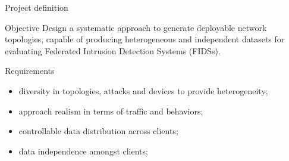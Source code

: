 \begin{frame}{Project definition}
  \begin{block}{Objective}
  Design a systematic approach to generate \alert<+>{deployable} network topologies, capable of producing \alert<+>{heterogeneous} and \alert<+>{independent} datasets for evaluating Federated Intrusion Detection Systems (FIDSs).
  \end{block}

  \pause
  \begin{block}{Requirements}
    \begin{itemize}[<+->]
      \item \alert{diversity} in topologies, attacks and devices to provide heterogeneity;
      \item approach \alert{realism} in terms of traffic and behaviors;
      \item \alert{controllable} data distribution across clients;
      \item data \alert{independence} amongst clients;
    \end{itemize}
  \end{block}
\end{frame}

